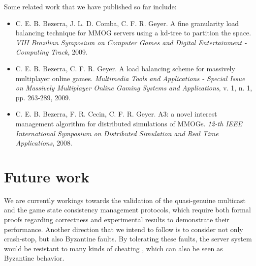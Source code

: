 \documentclass[]{usiinfprospectus}
\begin{document}
Some related work that we have published so far include:
\begin{itemize}
  \item C. E. B. Bezerra, J. L. D. Comba, C. F. R. Geyer. A fine granularity load balancing technique for MMOG servers using a kd-tree to partition the space. \textit{VIII Brazilian Symposium on Computer Games and Digital Entertainment - Computing Track}, 2009.
  \item C. E. B. Bezerra, C. F. R. Geyer. A load balancing scheme for massively multiplayer online games. \textit{Multimedia Tools and Applications - Special Issue on Massively Multiplayer Online Gaming Systems and Applications}, v. 1, n. 1, pp. 263-289, 2009.
  \item C. E. B. Bezerra, F. R. Cecin, C. F. R. Geyer. A3: a novel interest management algorithm for distributed simulations of MMOGs. \textit{12-th IEEE International Symposium on Distributed Simulation and Real Time Applications}, 2008.
\end{itemize}

\section{Future work} \label{sec:futurework}

We are currently workings towards the validation of the quasi-genuine multicast and the game state consistency management protocols, which require both formal proofs regarding correctness and experimental results to demonstrate their performance. Another direction that we intend to follow is to consider not only crash-stop, but also Byzantine faults. By tolerating these faults, the server system would be resistant to many kinds of cheating \cite{yan2005scc}, which can also be seen as Byzantine behavior.




\end{document}
